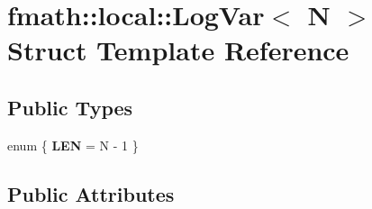 \hypertarget{structfmath_1_1local_1_1LogVar}{\section{fmath\-:\-:local\-:\-:Log\-Var$<$ N $>$ Struct Template Reference}
\label{structfmath_1_1local_1_1LogVar}
}
\subsection*{Public Types}
\begin{DoxyCompactItemize}
\item 
enum \{ {\bfseries L\-E\-N} =  N -\/ 1
 \}
\end{DoxyCompactItemize}
\subsection*{Public Attributes}
